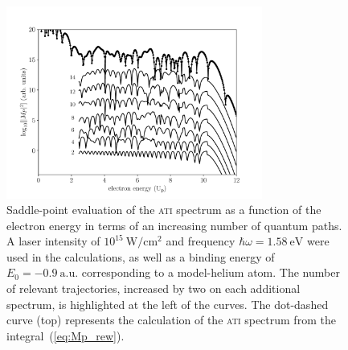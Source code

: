 \begin{figure}
  \centering \includegraphics[width =
    0.75\textwidth]{figures/ch_ATI_SPA/rescattering/14pathsvsqm.pdf}
  \caption{Saddle-point evaluation of the \textsc{ati} spectrum as a
    function of the electron energy in terms of an increasing number
    of quantum paths. A laser intensity of
    $10^{15}\ \mathrm{W/cm^{2}}$ and frequency $\hbar\omega =
    1.58\ \mathrm{eV}$ were used in the calculations, as well as a
    binding energy of $E_{0} = -0.9\ \mathrm{a.u.}$ corresponding to a
    model-helium atom. The number of relevant trajectories, increased
    by two on each additional spectrum, is highlighted at the left of
    the curves. The dot-dashed curve (top) represents the calculation
    of the \textsc{ati} spectrum from the integral~(\ref{eq:Mp_rew}).}
  \label{fig:ati_spectrum}
\end{figure}








